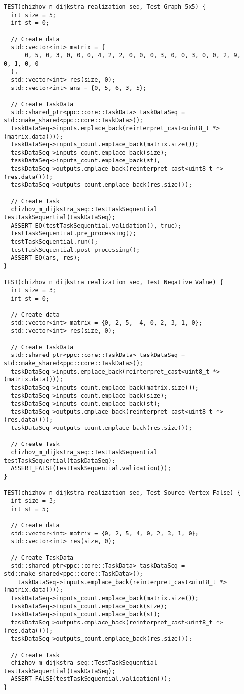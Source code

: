 \documentclass[a4paper, 14pt]{extarticle}
\begin{document}
\begin{lstlisting}
TEST(chizhov_m_dijkstra_realization_seq, Test_Graph_5x5) {
  int size = 5;
  int st = 0;

  // Create data
  std::vector<int> matrix = {
      0, 5, 0, 3, 0, 0, 0, 4, 2, 2, 0, 0, 0, 3, 0, 0, 3, 0, 0, 2, 9, 0, 1, 0, 0
  };
  std::vector<int> res(size, 0);
  std::vector<int> ans = {0, 5, 6, 3, 5};

  // Create TaskData
  std::shared_ptr<ppc::core::TaskData> taskDataSeq = std::make_shared<ppc::core::TaskData>();
  taskDataSeq->inputs.emplace_back(reinterpret_cast<uint8_t *>(matrix.data()));
  taskDataSeq->inputs_count.emplace_back(matrix.size());
  taskDataSeq->inputs_count.emplace_back(size);
  taskDataSeq->inputs_count.emplace_back(st);
  taskDataSeq->outputs.emplace_back(reinterpret_cast<uint8_t *>(res.data()));
  taskDataSeq->outputs_count.emplace_back(res.size());

  // Create Task
  chizhov_m_dijkstra_seq::TestTaskSequential testTaskSequential(taskDataSeq);
  ASSERT_EQ(testTaskSequential.validation(), true);
  testTaskSequential.pre_processing();
  testTaskSequential.run();
  testTaskSequential.post_processing();
  ASSERT_EQ(ans, res);
}

TEST(chizhov_m_dijkstra_realization_seq, Test_Negative_Value) {
  int size = 3;
  int st = 0;

  // Create data
  std::vector<int> matrix = {0, 2, 5, -4, 0, 2, 3, 1, 0};
  std::vector<int> res(size, 0);

  // Create TaskData
  std::shared_ptr<ppc::core::TaskData> taskDataSeq = std::make_shared<ppc::core::TaskData>();
  taskDataSeq->inputs.emplace_back(reinterpret_cast<uint8_t *>(matrix.data()));
  taskDataSeq->inputs_count.emplace_back(matrix.size());
  taskDataSeq->inputs_count.emplace_back(size);
  taskDataSeq->inputs_count.emplace_back(st);
  taskDataSeq->outputs.emplace_back(reinterpret_cast<uint8_t *>(res.data()));
  taskDataSeq->outputs_count.emplace_back(res.size());

  // Create Task
  chizhov_m_dijkstra_seq::TestTaskSequential testTaskSequential(taskDataSeq);
  ASSERT_FALSE(testTaskSequential.validation());
}

TEST(chizhov_m_dijkstra_realization_seq, Test_Source_Vertex_False) {
  int size = 3;
  int st = 5;

  // Create data
  std::vector<int> matrix = {0, 2, 5, 4, 0, 2, 3, 1, 0};
  std::vector<int> res(size, 0);

  // Create TaskData
  std::shared_ptr<ppc::core::TaskData> taskDataSeq = std::make_shared<ppc::core::TaskData>();
    taskDataSeq->inputs.emplace_back(reinterpret_cast<uint8_t *>(matrix.data()));
  taskDataSeq->inputs_count.emplace_back(matrix.size());
  taskDataSeq->inputs_count.emplace_back(size);
  taskDataSeq->inputs_count.emplace_back(st);
  taskDataSeq->outputs.emplace_back(reinterpret_cast<uint8_t *>(res.data()));
  taskDataSeq->outputs_count.emplace_back(res.size());

  // Create Task
  chizhov_m_dijkstra_seq::TestTaskSequential testTaskSequential(taskDataSeq);
  ASSERT_FALSE(testTaskSequential.validation());
}
\end{lstlisting}
\end{document}
